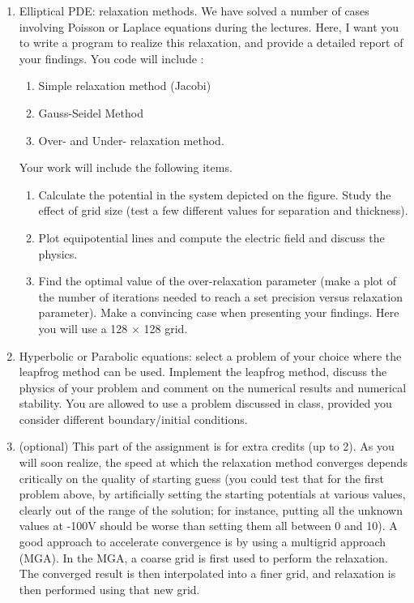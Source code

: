 \documentclass{report}
\begin{document}
\begin{enumerate}
\item Elliptical PDE: relaxation methods. We have solved a number of cases involving Poisson or
Laplace equations during the lectures. Here, I want you to write a
program to realize this relaxation, and provide a detailed report of your findings.
You code will include :
\begin{enumerate}
\item Simple relaxation method (Jacobi)
\item Gauss-Seidel Method
\item Over- and Under- relaxation method. 
\end{enumerate}
Your work will include the following items.
\begin{enumerate}
\item Calculate the potential in the system depicted on the figure.  Study the effect of grid size (test a few different values for separation and thickness). 
\item Plot equipotential lines and compute the electric field and discuss the physics. 
\item Find the optimal value of the over-relaxation parameter (make a plot of the number of iterations needed to reach a set precision
versus relaxation parameter). Make a convincing case when presenting
your findings. Here you will use a 128 $\times$ 128 grid.
\end{enumerate}
\item Hyperbolic or Parabolic equations: select a problem of your choice where the leapfrog method can be used. Implement the leapfrog method, discuss the physics of your problem and comment on the numerical results and numerical stability. You are allowed to use a problem discussed in class, provided you consider different boundary/initial conditions. 
\item (optional) This part of the assignment is for extra credits (up to 2). As you
  will soon realize, the speed at which the relaxation method
  converges depends critically on the quality of starting guess (you could test
  that for the first problem above, by artificially setting the
  starting potentials at various values, clearly out of the range of
  the solution; for instance, putting all the unknown values at -100V
  should be worse than setting them all between 0 and 10). A good
  approach to accelerate convergence is by using a multigrid approach
  (MGA). In the MGA, a coarse grid is first used to perform the
  relaxation. The converged result is then interpolated into a finer
  grid, and relaxation is then performed using that new grid.
  

\end{enumerate}
\end{document}
